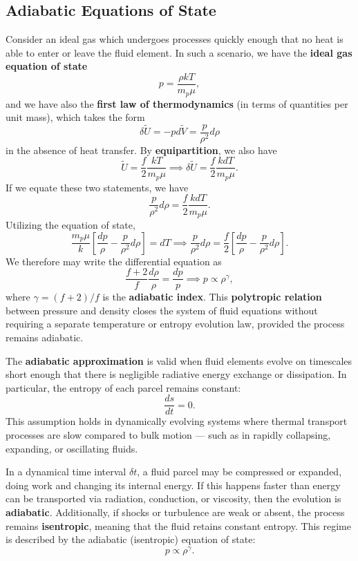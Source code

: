 \subsection{Adiabatic Equations of State}

Consider an ideal gas which undergoes processes quickly enough that no heat is able to enter or leave the fluid element. In such a scenario, we have the \textbf{ideal gas equation of state}
\[
p = \frac{\rho kT}{m_p\mu},
\]
and we have also the \textbf{first law of thermodynamics} (in terms of quantities per unit mass), which takes the form
\[
\delta \tilde{U} = - p d\tilde{V} = \frac{p}{\rho^2} d\rho
\]
in the absence of heat transfer.  By \textbf{equipartition}, we also have
\[
\tilde{U} = \frac{f}{2} \frac{kT}{m_p\mu} \implies \delta \tilde{U} = \frac{f}{2} \frac{kdT}{m_p \mu}.
\]
If we equate these two statements, we have
\[
\frac{p}{\rho^2} d\rho = \frac{f}{2} \frac{k dT}{m_p\mu}.
\]
Utilizing the equation of state,
\[
\frac{m_p \mu}{k} \left[\frac{dp}{\rho} - \frac{p}{\rho^2} d\rho \right]= dT \implies \frac{p}{\rho^2} d\rho =\frac{f}{2}\left[\frac{dp}{\rho} - \frac{p}{\rho^2} d\rho\right].
\]
We therefore may write the differential equation as
\[
\frac{f+2}{f} \frac{d\rho}{\rho} = \frac{dp}{p} \implies p \propto \rho^{\gamma},
\]
where $\gamma = (f+2)/f$ is the \textbf{adiabatic index}. This \textbf{polytropic relation} between pressure and density closes the system of fluid equations without requiring a separate temperature or entropy evolution law, provided the process remains adiabatic.

\vspace{0.3em}
The \textbf{adiabatic approximation} is valid when fluid elements evolve on timescales short enough that there is negligible radiative energy exchange or dissipation. In particular, the entropy of each parcel remains constant:
\[
\frac{ds}{dt} = 0.
\]
This assumption holds in dynamically evolving systems where thermal transport processes are slow compared to bulk motion — such as in rapidly collapsing, expanding, or oscillating fluids.

\begin{remark}
    In a dynamical time interval \( \delta t \), a fluid parcel may be compressed or expanded, doing work and changing its internal energy. If this happens faster than energy can be transported via radiation, conduction, or viscosity, then the evolution is \textbf{adiabatic}. Additionally, if shocks or turbulence are weak or absent, the process remains \textbf{isentropic}, meaning that the fluid retains constant entropy. This regime is described by the adiabatic (isentropic) equation of state:
    \[
    p \propto \rho^\gamma.
    \]
\end{remark}

